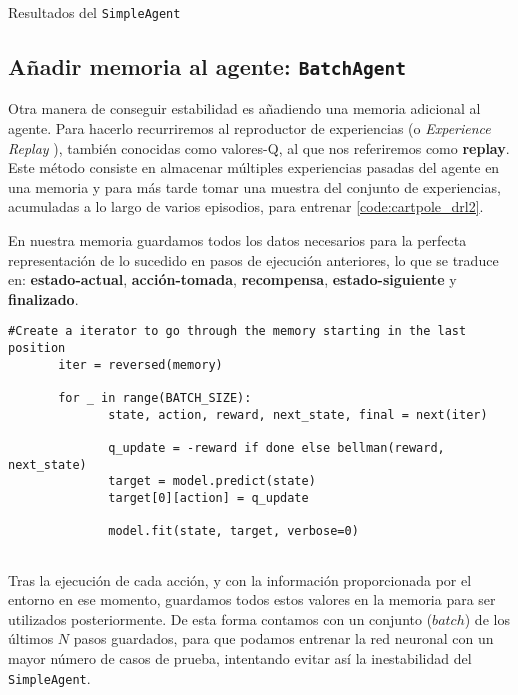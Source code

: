%
       {Resultados del \texttt{SimpleAgent}}

\subsection{Añadir memoria al agente: \texttt{BatchAgent}}
\label{sec:cartpoledqn2}

Otra manera de conseguir estabilidad es añadiendo una memoria adicional al agente. Para hacerlo recurriremos al reproductor de experiencias (o \textit{Experience Replay} \citep{Lin1992}), también conocidas como valores-Q, al que nos referiremos como \textbf{replay}. Este método consiste en almacenar múltiples experiencias pasadas del agente en una memoria y para más tarde tomar una muestra del conjunto de experiencias, acumuladas a lo largo de varios episodios, para entrenar \ref{code:cartpole_drl2}.

En nuestra memoria guardamos todos los datos necesarios para la perfecta representación de lo sucedido en pasos de ejecución anteriores, lo que se traduce en: \textbf{estado-actual}, \textbf{acción-tomada}, \textbf{recompensa}, \textbf{estado-siguiente} y \textbf{finalizado}.

\begin{minipage}{0.9\linewidth}%
\begin{lstlisting}[frame=tb, caption=Pseudocódigo funcion Replay de BatchAgent, inputencoding=latin1, label=code:cartpole_drl2]
       #Create a iterator to go through the memory starting in the last position 
       iter = reversed(memory)
       
       for _ in range(BATCH_SIZE):
              state, action, reward, next_state, final = next(iter)

              q_update = -reward if done else bellman(reward, next_state)
              target = model.predict(state)
              target[0][action] = q_update

              model.fit(state, target, verbose=0)
              
\end{lstlisting}%
\end{minipage}

Tras la ejecución de cada acción, y con la información proporcionada por el entorno en ese momento, guardamos todos estos valores en la memoria para ser utilizados posteriormente. De esta forma contamos con un conjunto ($batch$) de los últimos $N$ pasos guardados, para que podamos entrenar la red neuronal con un mayor número de casos de prueba, intentando evitar así la inestabilidad del \texttt{SimpleAgent}.

